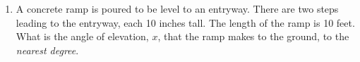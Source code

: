 \documentclass[12pt, twoside]{article}
\begin{document}
\begin{enumerate}
\item A concrete ramp is poured to be level to an entryway. There are two steps leading to the entryway, each 10 inches tall. The length of the ramp is 10 feet. What is the angle of elevation, $x$, that the ramp makes to the ground, to the \emph{nearest degree}.\\[1.cm]
       \vspace{5cm}



  \end{enumerate}
  
\end{document}
